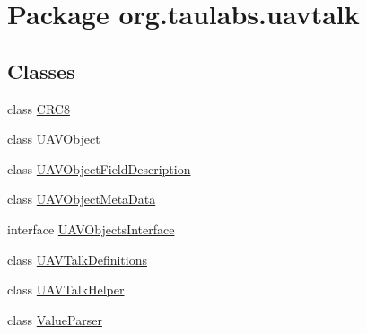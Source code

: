 \hypertarget{namespaceorg_1_1taulabs_1_1uavtalk}{\section{\-Package org.\-taulabs.\-uavtalk}
\label{namespaceorg_1_1taulabs_1_1uavtalk}
}
\subsection*{\-Classes}
\begin{DoxyCompactItemize}
\item 
class \hyperlink{classorg_1_1taulabs_1_1uavtalk_1_1_c_r_c8}{\-C\-R\-C8}
\item 
class \hyperlink{classorg_1_1taulabs_1_1uavtalk_1_1_u_a_v_object}{\-U\-A\-V\-Object}
\item 
class \hyperlink{classorg_1_1taulabs_1_1uavtalk_1_1_u_a_v_object_field_description}{\-U\-A\-V\-Object\-Field\-Description}
\item 
class \hyperlink{classorg_1_1taulabs_1_1uavtalk_1_1_u_a_v_object_meta_data}{\-U\-A\-V\-Object\-Meta\-Data}
\item 
interface \hyperlink{interfaceorg_1_1taulabs_1_1uavtalk_1_1_u_a_v_objects_interface}{\-U\-A\-V\-Objects\-Interface}
\item 
class \hyperlink{classorg_1_1taulabs_1_1uavtalk_1_1_u_a_v_talk_definitions}{\-U\-A\-V\-Talk\-Definitions}
\item 
class \hyperlink{classorg_1_1taulabs_1_1uavtalk_1_1_u_a_v_talk_helper}{\-U\-A\-V\-Talk\-Helper}
\item 
class \hyperlink{classorg_1_1taulabs_1_1uavtalk_1_1_value_parser}{\-Value\-Parser}
\end{DoxyCompactItemize}
